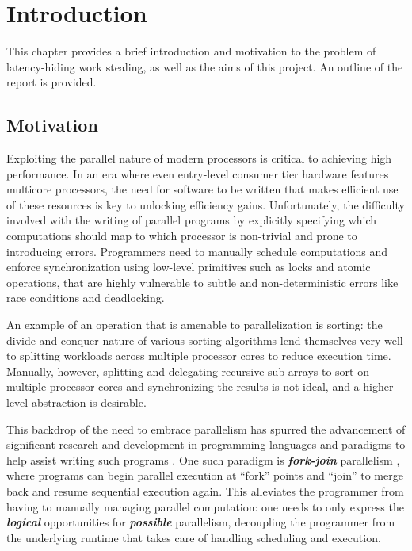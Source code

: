 \documentclass[bsc,frontabs,singlespacing,parskip,deptreport,normalheadings]{infthesis}
\begin{document}

\chapter{Introduction}

This chapter provides a brief introduction and motivation to the problem of
latency-hiding work stealing, as well as the aims of this project. An outline of
the report is provided.

\section{Motivation}

Exploiting the parallel nature of modern processors is critical to achieving
high performance. In an era where even entry-level consumer tier hardware
features multicore processors, the need for software to be written that
makes efficient use of these resources is key to unlocking efficiency gains.
Unfortunately, the difficulty involved with the writing of parallel programs by
explicitly specifying which computations should map to which processor is
non-trivial and prone to introducing errors. Programmers need to manually
schedule computations and enforce synchronization using low-level primitives
such as locks and atomic operations, that are highly vulnerable to subtle and
non-deterministic errors like race conditions and deadlocking.

An example of an operation that is amenable to parallelization is sorting: the
divide-and-conquer nature of various sorting algorithms lend themselves very
well to splitting workloads across multiple processor cores to reduce execution
time. Manually, however, splitting and delegating recursive sub-arrays to sort
on multiple processor cores and synchronizing the results is not ideal, and a
higher-level abstraction is desirable.

This backdrop of the need to embrace parallelism has spurred the advancement of
significant research and development in programming languages and paradigms to
help assist writing such programs \cite{muller_latency-hiding_2016,
zakian_concurrent_2016}. One such paradigm is \textit{\textbf{fork-join}}
parallelism \cite{conway_multiprocessor_1963, nyman_notes_2016}, where programs
can begin parallel execution at ``fork'' points and ``join'' to merge back and
resume sequential execution again. This alleviates the programmer from having to
manually managing parallel computation: one needs to only express the
\textbf{\textit{logical}} opportunities for \textit{\textbf{possible}}
parallelism, decoupling the programmer from the underlying runtime that takes
care of handling scheduling and execution.
\end{document}
